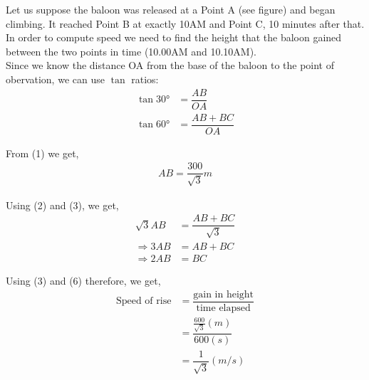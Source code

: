 \begin{solution}[\fullpage]
	Let us suppose the baloon was released at a Point A (see figure) and began climbing. It reached Point B at exactly 10AM and Point C, 10 minutes after that. In order to compute speed we need to find the height that the baloon gained between the two points in time (10.00AM and 10.10AM). \\
	Since we know the distance OA from the base of the baloon to the point of obervation, we can use $\tan$ ratios:
	\begin{align}
		\tan\ang{30} &= \dfrac{AB}{OA}	\\		
		\tan\ang{60} &= \dfrac{AB+BC}{OA}
	\end{align}
	
	From (1) we get,
	\begin{align}
		AB = \dfrac{300}{\sqrt{3}} m
	\end{align}	
	
	Using (2) and (3), we get,
	\begin{align}
		\sqrt{3}AB &= \dfrac{AB+BC}{\sqrt{3}}	\\		
		\Rightarrow 3AB &= AB+BC				\\
		\Rightarrow 2AB &= BC
	\end{align}

	Using (3) and (6) therefore, we get,
	\begin{align}
		\text{Speed of rise} &= \dfrac{\text{gain in height}}{\text{time elapsed}} \\
							 &= \dfrac{\frac{600}{\sqrt{3}}(m)}{600(s)}	\\
							 &= \dfrac{1}{\sqrt{3}}(m/s)
	\end{align}	
		
\end{solution}
